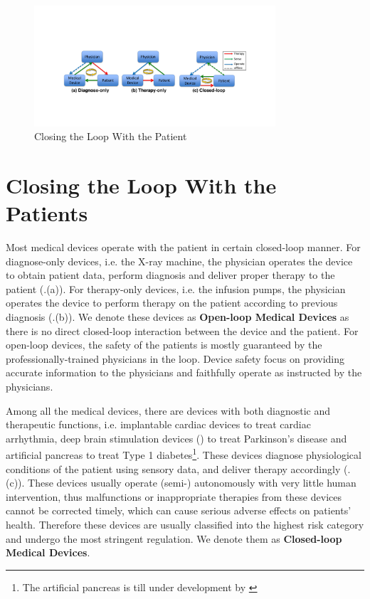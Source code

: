 \begin{figure}[t]
		\centering
		\includegraphics[width=0.8\textwidth]{figs/closed-loop.pdf}
		\caption{\small Closing the Loop With the Patient}
		\label{fig:closed-loop}
\end{figure}

\section{Closing the Loop With the Patients}
Most medical devices operate with the patient in certain closed-loop manner. For diagnose-only devices, i.e. the X-ray machine, the physician operates the device to obtain patient data, perform diagnosis and deliver proper therapy to the patient (.(a)). For therapy-only devices, i.e. the infusion pumps, the physician operates the device to perform therapy on the patient according to previous diagnosis (.(b)). We denote these devices as \textbf{Open-loop Medical Devices} as there is no direct closed-loop interaction between the device and the patient. For open-loop devices, the safety of the patients is mostly guaranteed by the professionally-trained physicians in the loop. Device safety focus on providing accurate information to the physicians and faithfully operate as instructed by the physicians.

Among all the medical devices, there are devices with both diagnostic and therapeutic functions, i.e. implantable cardiac devices to treat cardiac arrhythmia, deep brain stimulation devices (\cite{Brain_sti}) to treat Parkinson's disease and artificial pancreas to treat Type 1 diabetes\footnote{The artificial pancreas is till under development by \cite{}}. These devices diagnose physiological conditions of the patient using sensory data, and deliver therapy accordingly (.(c)). These devices usually operate (semi-) autonomously with very little human intervention, thus malfunctions or inappropriate therapies from these devices cannot be corrected timely, which can cause serious adverse effects on patients' health. Therefore these devices are usually classified into the highest risk category and undergo the most stringent regulation. We denote them as \textbf{Closed-loop Medical Devices}. 

